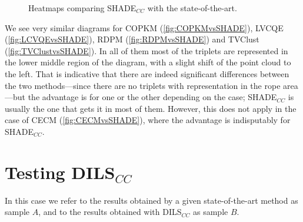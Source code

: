 \begin{figure}[bth]
	\myfloatalign
	 \quad
	 \quad
	\caption{Heatmaps comparing \acs{SHADE}$_{CC}$ with the state-of-the-art.}
	\label{fig:HeatmapsSHADEvsSOTA}
\end{figure}

We see very similar diagrams for \acs{COPKM} (\ref{fig:COPKMvsSHADE}), LVCQE (\ref{fig:LCVQEvsSHADE}), \acs{RDPM} (\ref{fig:RDPMvsSHADE}) and \acs{TVClust} (\ref{fig:TVClustvsSHADE}). In all of them most of the triplets are represented in the lower middle region of the diagram, with a slight shift of the point cloud to the left. That is indicative that there are indeed significant differences between the two methods---since there are no triplets with representation in the rope area---but the advantage is for one or the other depending on the case; \acs{SHADE}$_{CC}$ is usually the one that gets it in most of them. However, this does not apply in the case of \acs{CECM} (\ref{fig:CECMvsSHADE}), where the advantage is indisputably for \acs{SHADE}$_{CC}$.

\section[Testing \acsfont{DILS}$_{CC}$]{Testing DILS$_{CC}$} \label{sec:TestDILS}

In this case we refer to the results obtained by a given state-of-the-art method as sample $A$, and to the results obtained with \acs{DILS}$_{CC}$ as sample $B$.

